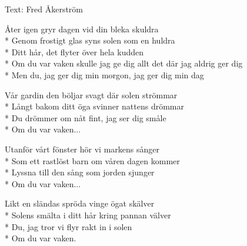 \begin{SongText}
\begin{SongInfo}
    Text: Fred Åkerström
\end{SongInfo}
\begin{SongVerse}
Åter igen gryr dagen vid din bleka skuldra\\*%
Genom frostigt glas syns solen som en huldra\\*%
Ditt hår, det flyter över hela kudden\\*%
Om du var vaken skulle jag ge dig allt det där jag aldrig ger dig\\*%
Men du, jag ger dig min morgon, jag ger dig min dag
\end{SongVerse}
\begin{SongVerse}
Vår gardin den böljar svagt där solen strömmar\\*%
Långt bakom ditt öga svinner nattens drömmar\\*%
Du drömmer om nåt fint, jag ser dig småle\\*%
Om du var vaken... 
\end{SongVerse}
\begin{SongVerse}
Utanför vårt fönster hör vi markens sånger\\*%
Som ett rastlöst barn om våren dagen kommer\\*%
Lyssna till den sång som jorden sjunger\\*%
Om du var vaken...
\end{SongVerse}
\begin{SongVerse}
Likt en sländas spröda vinge ögat skälver\\*%
Solens smälta i ditt hår kring pannan välver\\*%
Du, jag tror vi flyr rakt in i solen\\*%
Om du var vaken.
\end{SongVerse}
\end{SongText}
